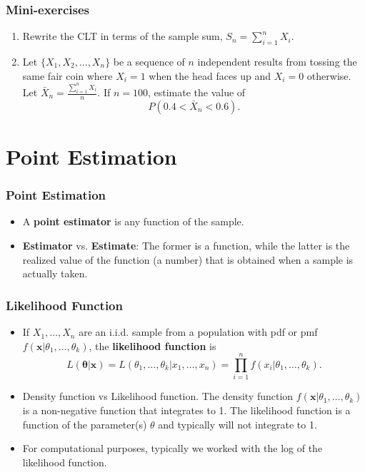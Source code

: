 \documentclass{beamer}
\begin{document}
\begin{frame}
\frametitle{Mini-exercises}
\begin{enumerate}
\item Rewrite the CLT in terms of the sample sum, $S_n = \sum_{i=1}^n X_i$.
\vspace*{1in}
\item Let $\{X_1,X_2,\ldots,X_n\}$ be a sequence of $n$ independent results from tossing the same fair coin where $X_i = 1$ when the head faces up and $X_i = 0$ otherwise. Let $\bar{X}_n = \frac{\sum_{i=1}^n X_i}{n}$. If $n=100$, estimate the value of 
$$
P(0.4 < \bar{X}_n < 0.6).
$$
\vspace*{0.7in}
\end{enumerate}
\end{frame}


\section{Point Estimation}
\begin{frame}
\frametitle{Point Estimation}
\begin{itemize}
\item A \textbf{point estimator} is any function of the sample.
\item \textbf{Estimator} vs. \textbf{Estimate}: The former is a function, while the latter is the realized value of the function (a number) that is obtained when a sample is actually taken.
\end{itemize}
\end{frame}

\begin{frame}
\frametitle{Likelihood Function}
\begin{itemize}
\item If $X_1,\ldots,X_n$ are an i.i.d. sample from a population with pdf or pmf $f(\mathbf{x}|\theta_1,\ldots,\theta_k)$, the \textbf{likelihood function} is
$$
L(\mathbf{\theta}|\mathbf{x}) = L(\theta_1,\ldots,\theta_k|x_1,\ldots,x_n) = \prod_{i=1}^n f(x_i|\theta_1,\ldots,\theta_k).
$$
\item Density function vs Likelihood function. The density function $f(\mathbf{x}|\theta_1,\ldots,\theta_k)$ is a non-negative function that integrates to 1. The likelihood function is a function of the parameter(s) $\theta$ and typically will not integrate to 1.

\item For computational purposes, typically we worked with the log of the likelihood function.

\end{itemize}
\end{frame}
\end{document}
